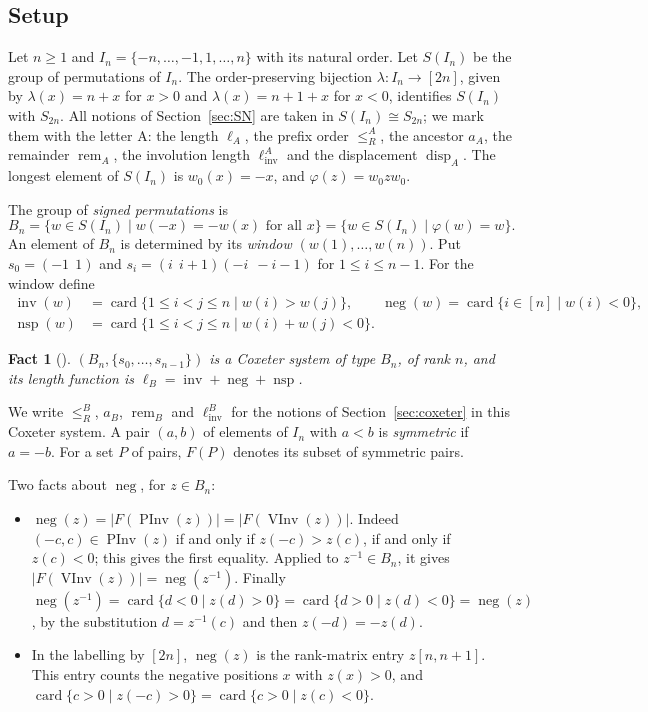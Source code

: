 \documentclass[11pt]{amsart}
\newtheorem{fact}[theorem]{Fact}
\theoremstyle{definition}
\theoremstyle{remark}
\numberwithin{equation}{section}
\newcommand{\linv}{\ell_{\mathrm{inv}}}
\newcommand{\leR}{\le_R}
\newcommand{\abs}[1]{\lvert #1\rvert}
\DeclareMathOperator{\rem}{rem}
\DeclareMathOperator{\disp}{disp}
\DeclareMathOperator{\PInv}{PInv}
\DeclareMathOperator{\VInv}{VInv}
\DeclareMathOperator{\card}{card}
\DeclareMathOperator{\invB}{inv}
\DeclareMathOperator{\negB}{neg}
\DeclareMathOperator{\nspB}{nsp}
\begin{document}
\subsection{Setup}
Let \(n\ge1\) and \(I_n=\{-n,\dots,-1,1,\dots,n\}\) with its natural order. Let \(S(I_n)\) be the group of permutations of \(I_n\). The order-preserving bijection \(\lambda\colon I_n\to[2n]\), given by \(\lambda(x)=n+x\) for \(x>0\) and \(\lambda(x)=n+1+x\) for \(x<0\), identifies \(S(I_n)\) with \(S_{2n}\). All notions of Section~\ref{sec:SN} are taken in \(S(I_n)\cong S_{2n}\); we mark them with the letter A: the length \(\ell_A\), the prefix order \(\leR^A\), the ancestor \(a_A\), the remainder \(\rem_A\), the involution length \(\linv^A\) and the displacement \(\disp_A\). The longest element of \(S(I_n)\) is \(w_0(x)=-x\), and \(\varphi(z)=w_0zw_0\).

The group of \emph{signed permutations} is
\[
B_n=\{w\in S(I_n)\mid w(-x)=-w(x)\text{ for all }x\}=\{w\in S(I_n)\mid \varphi(w)=w\}.
\]
An element of \(B_n\) is determined by its \emph{window} \((w(1),\dots,w(n))\). Put \(s_0=(-1\ \ 1)\) and \(s_i=(i\ \ i+1)(-i\ \ -i-1)\) for \(1\le i\le n-1\). For the window define
\begin{align*}
\invB(w)&=\card\{1\le i<j\le n\mid w(i)>w(j)\},\qquad
\negB(w)=\card\{i\in[n]\mid w(i)<0\},\\
\nspB(w)&=\card\{1\le i<j\le n\mid w(i)+w(j)<0\}.
\end{align*}

\begin{fact}[{\cite[Ch.~8]{BB}}]\label{fact:B}
\((B_n,\{s_0,\dots,s_{n-1}\})\) is a Coxeter system of type \(B_n\), of rank \(n\), and its length function is \(\ell_B=\invB+\negB+\nspB\).
\end{fact}

We write \(\leR^B\), \(a_B\), \(\rem_B\) and \(\linv^B\) for the notions of Section~\ref{sec:coxeter} in this Coxeter system. A pair \((a,b)\) of elements of \(I_n\) with \(a<b\) is \emph{symmetric} if \(a=-b\). For a set \(P\) of pairs, \(F(P)\) denotes its subset of symmetric pairs.

Two facts about \(\negB\), for \(z\in B_n\):
\begin{itemize}
\item[(N1)] \(\negB(z)=\abs{F(\PInv(z))}=\abs{F(\VInv(z))}\). Indeed \((-c,c)\in\PInv(z)\) if and only if \(z(-c)>z(c)\), if and only if \(z(c)<0\); this gives the first equality. Applied to \(z^{-1}\in B_n\), it gives \(\abs{F(\VInv(z))}=\negB(z^{-1})\). Finally \(\negB(z^{-1})=\card\{d<0\mid z(d)>0\}=\card\{d>0\mid z(d)<0\}=\negB(z)\), by the substitution \(d=z^{-1}(c)\) and then \(z(-d)=-z(d)\).
\item[(N2)] In the labelling by \([2n]\), \(\negB(z)\) is the rank-matrix entry \(z[n,n+1]\). This entry counts the negative positions \(x\) with \(z(x)>0\), and \(\card\{c>0\mid z(-c)>0\}=\card\{c>0\mid z(c)<0\}\).
\end{itemize}
\end{document}
